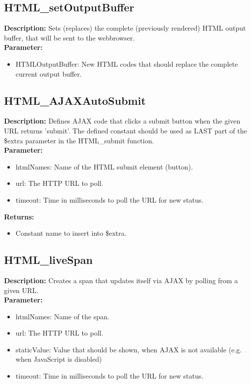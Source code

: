 \subsection{HTML\_setOutputBuffer}
\textbf{Description:} Sets (replaces) the complete (previously rendered) HTML output buffer, that will be sent to the webbrowser.\\
\textbf{Parameter:}
\begin{itemize}
\item HTMLOutputBuffer: New HTML codes that should replace the complete current output buffer.
\end{itemize}

\subsection{HTML\_AJAXAutoSubmit}
\textbf{Description:} Defines AJAX code that clicks a submit button when the given URL returns 'submit'. The defined constant should be used as LAST part of the \$extra parameter in the HTML\_submit function.\\
\textbf{Parameter:}
\begin{itemize}
\item htmlNames: Name of the HTML submit element (button).
\item url: The HTTP URL to poll.
\item timeout: Time in milliseconds to poll the URL for new status.
\end{itemize}
\textbf{Returns:}
\begin{itemize}
\item Constant name to insert into \$extra.
\end{itemize}

\subsection{HTML\_liveSpan}
\textbf{Description:} Creates a span that updates itself via AJAX by polling from a given URL.\\
\textbf{Parameter:}
\begin{itemize}
\item htmlNames: Name of the span.
\item url: The HTTP URL to poll.
\item staticValue: Value that should be shown, when AJAX is not available (e.g. when JavaScript is disabled)
\item timeout: Time in milliseconds to poll the URL for new status.
\end{itemize}

